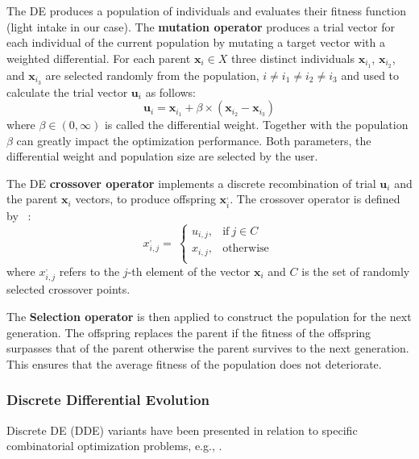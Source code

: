 The DE produces a population of individuals and evaluates their fitness function (light intake in our case). The \textbf{mutation operator} produces a trial vector for each individual of the current population by mutating a target vector with a weighted differential. 
For each parent $\mathbf{x}_{i}\in X$ three distinct individuals $\mathbf{x}_{i_1}$,  $\mathbf{x}_{i_2}$, and $\mathbf{x}_{i_3}$ are selected randomly from the population, $i \neq i_1 \neq i_2 \neq i_3$ and used to calculate the trial vector $\mathbf{u}_i$ as follows:
\begin{equation}
    \mathbf{u}_i = \mathbf{x}_{i_1}+\beta\times (\mathbf{x}_{i_2}-\mathbf{x}_{i_3})
\end{equation}
where $\beta \in (0, \infty )$ is called the differential weight. Together with the population $\beta$ can greatly impact the optimization performance. Both parameters, the differential weight and population size are selected by the user.

The DE  \textbf{crossover operator} implements a discrete recombination of trial $\mathbf{u}_i$ and the parent $\mathbf{x}_i$ vectors, to produce offspring $\mathbf{x}^{,}_i$. The crossover operator is defined by ~\cite{engelbrecht2008computational}:
\begin{equation}
     x^{,}_{i,j} = \ \left\{ \begin{matrix}
u_{i,j}, & \mathrm{\text{if}}\ j \in C \\
x_{i,j}, & \mathrm{\text{otherwise}} \\
\end{matrix} \right.\   
\end{equation}
where $x^{,}_{i,j}$ refers to the $j$-th element of the vector $\mathbf{x}_i$ and $C$ is the set of randomly selected crossover points.

The \textbf{Selection operator} is then applied to construct the population for the next generation. The offspring replaces the parent if the fitness of the offspring surpasses that of the parent otherwise the parent survives to the next generation. This ensures that the average fitness of the population does not deteriorate.

\subsubsection{Discrete Differential Evolution}
Discrete DE (DDE) variants have been presented in relation to specific
combinatorial optimization problems, e.g., \cite{davendra_flow_2009,pan_discrete_2008,wang_novel_2010}. 

